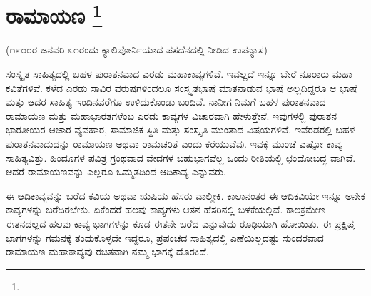 
\chapter[ರಾಮಾಯಣ ]{ರಾಮಾಯಣ \protect\footnote{}}

\begin{flushright}
(೧೯೦೦ರ ಜನವರಿ ೩೧ರಂದು ಕ್ಯಾಲಿಪೋರ್ನಿಯಾದ ಪಸದೆನದಲ್ಲಿ ನೀಡಿದ ಉಪನ್ಯಾಸ)
\end{flushright}

ಸಂಸ್ಕೃತ ಸಾಹಿತ್ಯದಲ್ಲಿ ಬಹಳ ಪುರಾತನವಾದ ಎರಡು ಮಹಾಕಾವ್ಯಗಳಿವೆ. ಇವಲ್ಲದೆ ಇನ್ನೂ ಬೇರೆ ನೂರಾರು ಮಹಾ ಕವಿತೆಗಳಿವೆ. ಕಳೆದ ಎರಡು ಸಾವಿರ ವರುಷಗಳಿಂದಲೂ ಸಂಸ್ಕೃತಭಾಷೆ ಮಾತನಾಡುವ ಭಾಷೆ ಅಲ್ಲದಿದ್ದರೂ ಆ ಭಾಷೆ ಮತ್ತು ಆದರ ಸಾಹಿತ್ಯ ಇಂದಿನವರೆಗೂ ಉಳಿದುಕೊಂಡು ಬಂದಿವೆ. ನಾನೀಗ ನಿಮಗೆ ಬಹಳ ಪುರಾತನವಾದ ರಾಮಾಯಣ ಮತ್ತು ಮಹಾಭಾರತಗಳೆಂಬ ಎರಡು ಕಾವ್ಯಗಳ ವಿಚಾರವಾಗಿ ಹೇಳುತ್ತೇನೆ. ಇವುಗಳಲ್ಲಿ ಪುರಾತನ ಭಾರತೀಯರ ಆಚಾರ ವ್ಯವಹಾರ, ಸಾಮಾಜಿಕ ಸ್ಥಿತಿ ಮತ್ತು ಸಂಸ್ಕೃತಿ ಮುಂತಾದ ವಿಷಯಗಳಿವೆ. ಇವೆರಡರಲ್ಲಿ ಬಹಳ ಪುರಾತನವಾದುದನ್ನು ರಾಮಾಯಣ ಅಥವಾ ರಾಮಚರಿತೆ ಎಂದು ಕರೆಯುವೆವು. ಇವಕ್ಕೆ ಮುಂಚೆ ಎಷ್ಟೋ ಕಾವ್ಯ ಸಾಹಿತ್ಯವಿತ್ತು. ಹಿಂದೂಗಳ ಪವಿತ್ರ ಗ್ರಂಥವಾದ ವೇದಗಳ ಬಹುಭಾಗವೆಲ್ಲ ಒಂದು ರೀತಿಯಲ್ಲಿ ಛಂದೋಬದ್ಧ ವಾಗಿವೆ. ಆದರೆ ರಾಮಾಯಣವನ್ನು ಎಲ್ಲರೂ ಒಮ್ಮತದಿಂದ ಆದಿಕಾವ್ಯ ಎನ್ನುವರು.

ಈ ಆದಿಕಾವ್ಯವನ್ನು ಬರೆದ ಕವಿಯ ಅಥವಾ ಋಷಿಯ ಹೆಸರು ವಾಲ್ಮೀಕಿ. ಕಾಲಾನಂತರ ಈ ಆದಿಕವಿಯೇ ಇನ್ನೂ ಅನೇಕ ಕಾವ್ಯಗಳನ್ನು ಬರೆದಿರಬೇಕು. ಏಕೆಂದರೆ ಹಲವು ಕಾವ್ಯಗಳು ಆತನ ಹೆಸರಿನಲ್ಲಿ ಬಳಕೆಯಲ್ಲಿವೆ. ಕಾಲಕ್ರಮೇಣ ಈತನದಲ್ಲದ ಹಲವು ಕಾವ್ಯ ಭಾಗಗಳನ್ನು ಕೂಡ ಈತನೇ ಬರೆದ ಎನ್ನುವುದು ರೂಢಿಯಾಗಿ ಹೋಯಿತು. ಈ ಪ್ರಕ್ಷಿಪ್ತ ಭಾಗಗಳನ್ನು ಗಮನಕ್ಕೆ ತಂದುಕೊಳ್ಳದೇ ಇದ್ದರೂ, ಪ್ರಪಂಚದ ಸಾಹಿತ್ಯದಲ್ಲಿ ಎಣೆಯಿಲ್ಲದಷ್ಟು ಸುಂದರವಾದ ರಾಮಾಯಣ ಮಹಾಕಾವ್ಯವು ರಚಿತವಾಗಿ ನಮ್ಮ ಭಾಗಕ್ಕೆ ದೊರಕಿದೆ.

